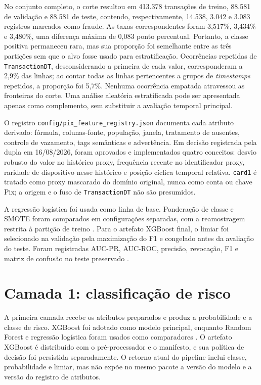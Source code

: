 No conjunto completo, o corte resultou em 413.378 transações de treino, 88.581 de validação e 88.581 de teste, contendo, respectivamente, 14.538, 3.042 e 3.083 registros marcados como fraude. As taxas correspondentes foram 3,517\%, 3,434\% e 3,480\%, uma diferença máxima de 0,083 ponto percentual. Portanto, a classe positiva permaneceu rara, mas sua proporção foi semelhante entre as três partições sem que o alvo fosse usado para estratificação. Ocorrências repetidas de \texttt{TransactionDT}, desconsiderando a primeira de cada valor, corresponderam a 2,9\% das linhas; ao contar todas as linhas pertencentes a grupos de \emph{timestamps} repetidos, a proporção foi 5,7\%. Nenhuma ocorrência empatada atravessou as fronteiras do corte. Uma análise aleatória estratificada pode ser apresentada apenas como complemento, sem substituir a avaliação temporal principal.

O registro \texttt{config/pix\_feature\_registry.json} documenta cada atributo derivado: fórmula, colunas-fonte, população, janela, tratamento de ausentes, controle de vazamento, tags semânticas e advertência. Em decisão registrada pela dupla em 16/08/2026, foram aprovados e implementados quatro conceitos: desvio robusto do valor no histórico proxy, frequência recente no identificador proxy, raridade de dispositivo nesse histórico e posição cíclica temporal relativa. \texttt{card1} é tratado como proxy mascarado do domínio original, nunca como conta ou chave Pix; a origem e o fuso de \texttt{TransactionDT} não são presumidos.

A regressão logística foi usada como linha de base. Ponderação de classe e SMOTE foram comparados em configurações separadas, com a reamostragem restrita à partição de treino \cite{chawla2002smote}. Para o artefato XGBoost final, o limiar foi selecionado na validação pela maximização do F1 e congelado antes da avaliação do teste. Foram registradas AUC-PR, AUC-ROC, precisão, revocação, F1 e matriz de confusão no teste preservado \cite{saito2015precision}.

\section{Camada 1: classificação de risco}

A primeira camada recebe os atributos preparados e produz a probabilidade e a classe de risco. XGBoost foi adotado como modelo principal, enquanto Random Forest e regressão logística foram usados como comparadores \cite{breiman2001random,chen2016xgboost}. O artefato XGBoost é distribuído com o pré-processador e o manifesto, e sua política de decisão foi persistida separadamente. O retorno atual do pipeline inclui classe, probabilidade e limiar, mas não expõe no mesmo pacote a versão do modelo e a versão do registro de atributos.

